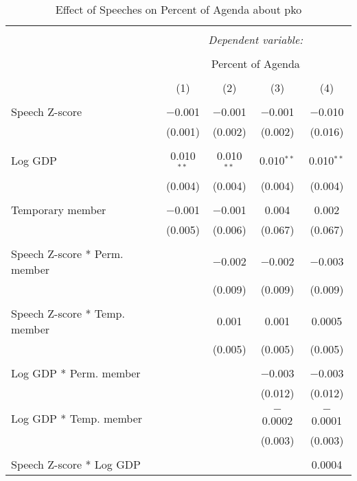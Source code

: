 
\begin{table}[!htbp] \centering 
  \caption{Effect of Speeches on Percent of Agenda about pko} 
  \label{} 
\begin{tabular}{@{\extracolsep{5pt}}lcccc} 
\\[-1.8ex]\hline 
\hline \\[-1.8ex] 
 & \multicolumn{4}{c}{\textit{Dependent variable:}} \\ 
\cline{2-5} 
\\[-1.8ex] & \multicolumn{4}{c}{Percent of Agenda} \\ 
\\[-1.8ex] & (1) & (2) & (3) & (4)\\ 
\hline \\[-1.8ex] 
 Speech Z-score & $-$0.001 & $-$0.001 & $-$0.001 & $-$0.010 \\ 
  & (0.001) & (0.002) & (0.002) & (0.016) \\ 
  & & & & \\ 
 Log GDP & 0.010$^{**}$ & 0.010$^{**}$ & 0.010$^{**}$ & 0.010$^{**}$ \\ 
  & (0.004) & (0.004) & (0.004) & (0.004) \\ 
  & & & & \\ 
 Temporary member & $-$0.001 & $-$0.001 & 0.004 & 0.002 \\ 
  & (0.005) & (0.006) & (0.067) & (0.067) \\ 
  & & & & \\ 
 Speech Z-score * Perm. member &  & $-$0.002 & $-$0.002 & $-$0.003 \\ 
  &  & (0.009) & (0.009) & (0.009) \\ 
  & & & & \\ 
 Speech Z-score * Temp. member &  & 0.001 & 0.001 & 0.0005 \\ 
  &  & (0.005) & (0.005) & (0.005) \\ 
  & & & & \\ 
 Log GDP * Perm. member &  &  & $-$0.003 & $-$0.003 \\ 
  &  &  & (0.012) & (0.012) \\ 
  & & & & \\ 
 Log GDP * Temp. member &  &  & $-$0.0002 & $-$0.0001 \\ 
  &  &  & (0.003) & (0.003) \\ 
  & & & & \\ 
 Speech Z-score * Log GDP &  &  &  & 0.0004 \\ 

\end{tabular}
\end{table}
